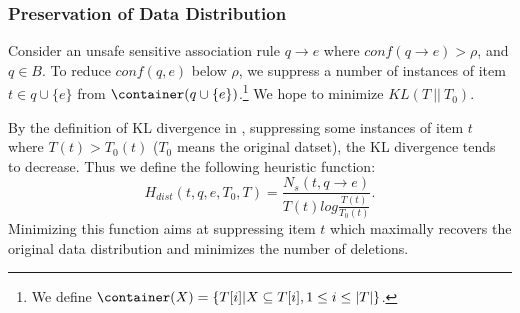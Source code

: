 \subsubsection{Preservation of Data Distribution}
Consider an unsafe sensitive association rule $q \rightarrow e$ where
$conf(q \rightarrow e) > \rho$, and $q \in B$.
To reduce $conf(q,e)$ below $\rho$,
we suppress a number of instances of item $t\in q \cup \{e\}$ from
$\container(q\cup \{e\})$.\footnote{We define $\container(X)=\{T[i]|X\subseteq T[i], 1\le i\le |T|\}$.} We hope to minimize $KL(T ~||~ T_0)$.



By the definition of KL divergence in , 
suppressing some instances of item $t$
where $T(t)>T_0(t)$ ($T_0$ means the original datset),
the KL divergence tends to decrease. 
Thus we define the following heuristic function:
\begin{equation}\label{eq:hdist}
H_{dist}(t, q, e, T_0, T) =
	\frac{N_s(t, q\rightarrow e)}{T(t)log\frac{T(t)}{T_0(t)}}.
\end{equation}
Minimizing this function aims at
suppressing item $t$ which maximally recovers the original
data distribution and minimizes the number of deletions.

